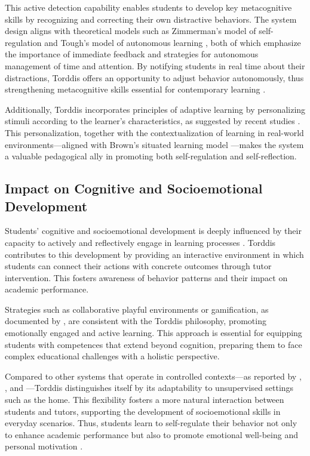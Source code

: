 			This active detection capability enables students to develop key metacognitive skills by recognizing and correcting their own distractive behaviors. The system design aligns with theoretical models such as Zimmerman’s model of self-regulation \citep{Zimmerman2013Self} and Tough’s model of autonomous learning \citep{Tough1985Andragogy}, both of which emphasize the importance of immediate feedback and strategies for autonomous management of time and attention. By notifying students in real time about their distractions, Torddis offers an opportunity to adjust behavior autonomously, thus strengthening metacognitive skills essential for contemporary learning \citep{Ackermans2025Young,Al-Gburi2023}.
			
			Additionally, Torddis incorporates principles of adaptive learning by personalizing stimuli according to the learner’s characteristics, as suggested by recent studies \citep{Dhananjaya2024Digital,Mwambe2022,Sundari2024Transforming}. This personalization, together with the contextualization of learning in real-world environments—aligned with Brown’s situated learning model \citep{Brown1989}—makes the system a valuable pedagogical ally in promoting both self-regulation and self-reflection.
			
		\subsection{Impact on Cognitive and Socioemotional Development}
			Students’ cognitive and socioemotional development is deeply influenced by their capacity to actively and reflectively engage in learning processes \citep{SaezLopez2016Visual,Mohamed2018Implementing,Palioura2025Storytelling}. Torddis contributes to this development by providing an interactive environment in which students can connect their actions with concrete outcomes through tutor intervention. This fosters awareness of behavior patterns and their impact on academic performance.
			
			Strategies such as collaborative playful environments or gamification, as documented by \cite{Echeverria2011AFramework}, are consistent with the Torddis philosophy, promoting emotionally engaged and active learning. This approach is essential for equipping students with competences that extend beyond cognition, preparing them to face complex educational challenges with a holistic perspective.
			
			Compared to other systems that operate in controlled contexts—as reported by \cite{Ackermans2025Young}, \cite{Berrezueta-Guzman2021}, and \cite{Wang2022Empowering}—Torddis distinguishes itself by its adaptability to unsupervised settings such as the home. This flexibility fosters a more natural interaction between students and tutors, supporting the development of socioemotional skills in everyday scenarios. Thus, students learn to self-regulate their behavior not only to enhance academic performance but also to promote emotional well-being and personal motivation \citep{Lopez2020EmoFindAR}.
			
